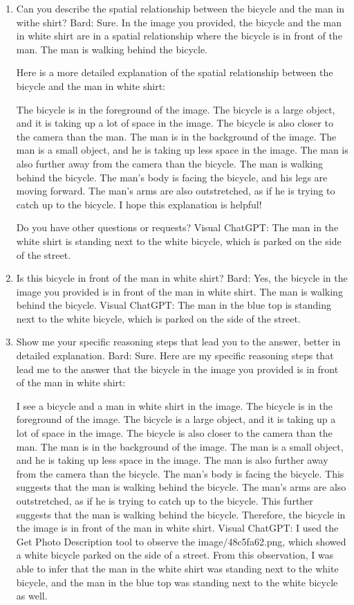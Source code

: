 \begin{enumerate}
    \item Can you describe the spatial relationship between the bicycle and the man in withe shirt?
    \subitem Bard: Sure. In the image you provided, the bicycle and the man in white shirt are in a spatial relationship where the bicycle is in front of the man. The man is walking behind the bicycle.

    Here is a more detailed explanation of the spatial relationship between the bicycle and the man in white shirt:
    
    The bicycle is in the foreground of the image. The bicycle is a large object, and it is taking up a lot of space in the image. The bicycle is also closer to the camera than the man.
    The man is in the background of the image. The man is a small object, and he is taking up less space in the image. The man is also further away from the camera than the bicycle.
    The man is walking behind the bicycle. The man's body is facing the bicycle, and his legs are moving forward. The man's arms are also outstretched, as if he is trying to catch up to the bicycle.
    I hope this explanation is helpful!
    
    Do you have other questions or requests?
    \subitem Visual ChatGPT: The man in the white shirt is standing next to the white bicycle, which is parked on the side of the street.
    \item Is this bicycle in front of the man in white shirt?
    \subitem Bard: 
    Yes, the bicycle in the image you provided is in front of the man in white shirt. The man is walking behind the bicycle. 
    \subitem Visual ChatGPT: The man in the blue top is standing next to the white bicycle, which is parked on the side of the street.
    \item Show me your specific reasoning steps that lead you to the answer, better in detailed explanation.
    \subitem Bard: 
    Sure. Here are my specific reasoning steps that lead me to the answer that the bicycle in the image you provided is in front of the man in white shirt:

    I see a bicycle and a man in white shirt in the image.
    The bicycle is in the foreground of the image. The bicycle is a large object, and it is taking up a lot of space in the image. The bicycle is also closer to the camera than the man.
    The man is in the background of the image. The man is a small object, and he is taking up less space in the image. The man is also further away from the camera than the bicycle.
    The man's body is facing the bicycle. This suggests that the man is walking behind the bicycle.
    The man's arms are also outstretched, as if he is trying to catch up to the bicycle. This further suggests that the man is walking behind the bicycle.
    Therefore, the bicycle in the image is in front of the man in white shirt.
    \subitem Visual ChatGPT: I used the Get Photo Description tool to observe the image/48c5fa62.png, which showed a white bicycle parked on the side of a street. From this observation, I was able to infer that the man in the white shirt was standing next to the white bicycle, and the man in the blue top was standing next to the white bicycle as well.
\end{enumerate}

